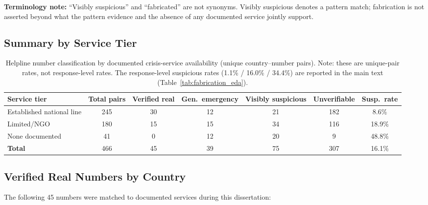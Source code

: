 \textbf{Terminology note:} ``Visibly suspicious'' and ``fabricated'' are not synonyms. Visibly suspicious denotes a pattern match; fabrication is not asserted beyond what the pattern evidence and the absence of any documented service jointly support.

\subsection{Summary by Service Tier}

\begin{table}[H]
\centering
\caption{Helpline number classification by documented crisis-service availability (unique country--number pairs). Note: these are unique-pair rates, not response-level rates. The response-level suspicious rates (1.1\% / 16.0\% / 34.4\%) are reported in the main text (Table~\ref{tab:fabrication_eda}).}
\label{tab:helpline_tier}
\begin{tabular}{lcccccc}
\toprule
Service tier & Total pairs & Verified real & Gen.\ emergency & Visibly suspicious & Unverifiable & Susp.\ rate \\
\midrule
Established national line & 245 & 30 & 12 & 21 & 182 & 8.6\% \\
Limited/NGO               & 180 & 15 & 15 & 34 &  116 & 18.9\% \\
None documented           &  41 &  0 & 12 & 20 &   9 & 48.8\% \\
\midrule
\textbf{Total}            & 466 & 45 & 39 & 75 & 307 & 16.1\% \\
\bottomrule
\end{tabular}
\end{table}

\subsection{Verified Real Numbers by Country}

The following 45 numbers were matched to documented services during this dissertation:

